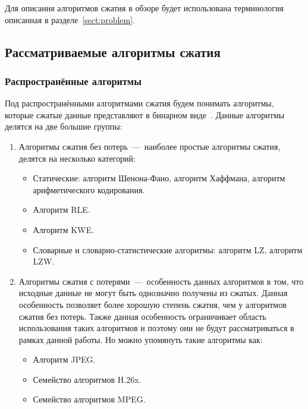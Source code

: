 \documentclass[oneside,final,12pt]{extarticle}
\begin{document}
        Для описания алгоритмов сжатия в обзоре будет использована терминология описанная в разделе~\ref{sect:problem}. 

    \subsection{Рассматриваемые алгоритмы сжатия}
        \subsubsection{Распространённые алгоритмы}
            Под распространёнными алгоритмами сжатия будем понимать алгоритмы, 
            которые сжатые данные представляют в бинарном виде~\cite{kodituwakku2010comparison}. 
            Данные алгоритмы делятся на две большие группы:
            \begin{enumerate}
                \item Алгоритмы сжатия без потерь~---~наиболее простые алгоритмы сжатия, делятся на несколько категорий:
                    \begin{itemize}
                    \item Статические: алгоритм Шенона-Фано, алгоритм Хаффмана, алгоритм арифметического кодирования.
                    \item Алгоритм RLE.
                    \item Алгоритм KWE.
                    \item Словарные и словарно-статистические алгоритмы: алгоритм LZ, алгоритм LZW.
                    \end{itemize}
                \item Алгоритмы сжатия с потерями~---~особенность данных алгоритмов в том, что исходные данные не могут быть однозначно
                    получены из сжатых. Данная особенность позволяет более хорошую степень сжатия, чем у алгоритмов сжатия без потерь.
                    Также данная особенность ограничивает область использования таких алгоритмов и поэтому они не будут рассматриваться в рамках данной работы. 
                    Но можно упомянуть такие алгоритмы как:
                    \begin{itemize}
                    \item Алгоритм JPEG.
                    \item Семейство алгоритмов H.26x.
                    \item Семейство алгоритмов MPEG.
                    \end{itemize}
            \end{enumerate}
            
\end{document}
